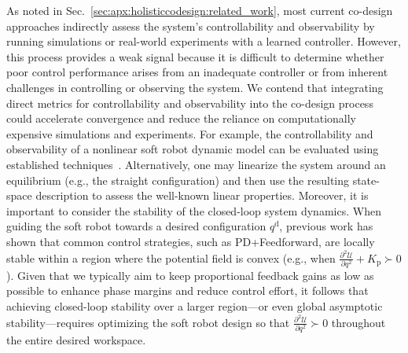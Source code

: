 As noted in Sec.~\ref{sec:apx:holisticcodesign:related_work}, most current co-design approaches indirectly assess the system’s controllability and observability by running simulations or real-world experiments with a learned controller. However, this process provides a weak signal because it is difficult to determine whether poor control performance arises from an inadequate controller or from inherent challenges in controlling or observing the system. We contend that integrating direct metrics for controllability and observability into the co-design process could accelerate convergence and reduce the reliance on computationally expensive simulations and experiments. For example, the controllability and observability of a nonlinear soft robot dynamic model can be evaluated using established techniques~\citep{griffith1971observability, zheng2019controllability}. Alternatively, one may linearize the system around an equilibrium (e.g., the straight configuration) and then use the resulting state-space description to assess the well-known linear properties. Moreover, it is important to consider the stability of the closed-loop system dynamics. When guiding the soft robot towards a desired configuration $q^\mathrm{d}$, previous work has shown that common control strategies, such as PD+Feedforward, are locally stable within a region where the potential field is convex (e.g., when $\frac{\partial^2 \mathcal{U}}{\partial q^2} + K_\mathrm{p} \succ 0$). Given that we typically aim to keep proportional feedback gains as low as possible to enhance phase margins and reduce control effort, it follows that achieving closed-loop stability over a larger region—or even global asymptotic stability—requires optimizing the soft robot design so that $\frac{\partial^2 \mathcal{U}}{\partial q^2} \succ 0$ throughout the entire desired workspace.
